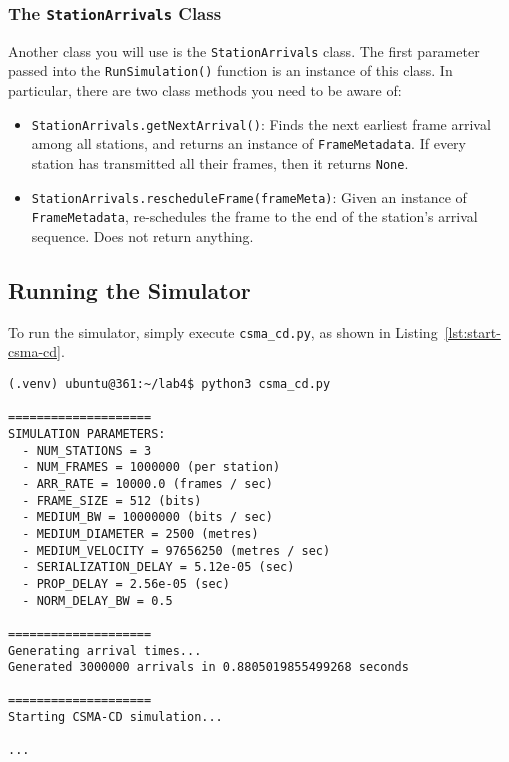\documentclass[11pt]{article}
\begin{document}
\subsubsection{The \texttt{StationArrivals} Class}
\label{subsubsec:stationarrivals}
Another class you will use is the \texttt{StationArrivals} class.
The first parameter passed into the \texttt{RunSimulation()} function is an instance of this class.
In particular, there are two class methods you need to be aware of:
\begin{itemize}
    \item \texttt{StationArrivals.getNextArrival()}: Finds the next earliest frame arrival among all stations, and returns an instance of \texttt{FrameMetadata}. If every station has transmitted all their frames, then it returns \texttt{None}.
    \item \texttt{StationArrivals.rescheduleFrame(frameMeta)}: Given an instance of \texttt{FrameMetadata}, re-schedules the frame to the end of the station's arrival sequence. Does not return anything.
\end{itemize}


\subsection{Running the Simulator}
\label{subsec:running-simulator}
To run the simulator, simply execute \texttt{csma\_cd.py}, as shown in Listing~\ref{lst:start-csma-cd}.
\begin{lstlisting}[style=ece361shell, caption={Running the CSMA/CD simulator}, label={lst:start-csma-cd}]
(.venv) ubuntu@361:~/lab4$ python3 csma_cd.py

====================
SIMULATION PARAMETERS:
  - NUM_STATIONS = 3
  - NUM_FRAMES = 1000000 (per station)
  - ARR_RATE = 10000.0 (frames / sec)
  - FRAME_SIZE = 512 (bits)
  - MEDIUM_BW = 10000000 (bits / sec)
  - MEDIUM_DIAMETER = 2500 (metres)
  - MEDIUM_VELOCITY = 97656250 (metres / sec)
  - SERIALIZATION_DELAY = 5.12e-05 (sec)
  - PROP_DELAY = 2.56e-05 (sec)
  - NORM_DELAY_BW = 0.5

====================
Generating arrival times...
Generated 3000000 arrivals in 0.8805019855499268 seconds

====================
Starting CSMA-CD simulation...

...

\end{lstlisting}
\end{document}
